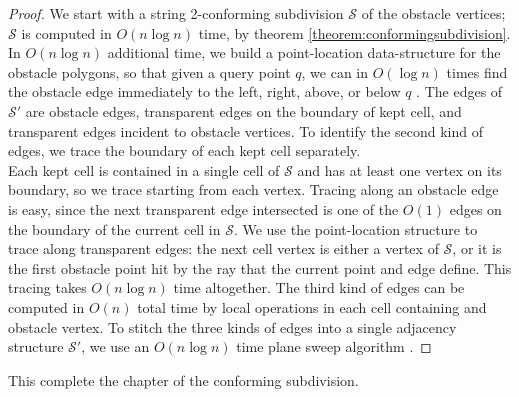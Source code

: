\begin{proof}
We start with a string 2-conforming subdivision $\mathcal{S}$ of the obstacle vertices; $\mathcal{S}$ is computed in $O(n\log n)$ time, by theorem \ref{theorem:conformingsubdivision}. In $O(n\log n)$ additional time, we build a point-location data-structure for the obstacle polygons, so that given a query point $q$, we can in $O(\log n)$ times find the obstacle edge immediately to the left, right, above, or below $q$ \cite{EdelsbrunnerGS86}\cite{Kirkpatrick83}. The edges of $\mathcal{S}'$ are obstacle edges, transparent edges on the boundary of kept cell, and transparent edges incident to obstacle vertices. To identify the second kind of edges, we trace the boundary of each kept cell separately. \\

Each kept cell is contained in a single cell of $\mathcal{S}$ and has at least one vertex on its boundary, so we trace starting from each vertex. Tracing along an obstacle edge is easy, since the next transparent edge intersected is one of the $O(1)$ edges on the boundary of the current cell in $\mathcal{S}$. We use the point-location structure to trace along transparent edges: the next cell vertex is either a vertex of $\mathcal{S}$, or it is the first obstacle point hit by the ray that the current point and edge define. This tracing takes $O(n\log n)$ time altogether. The third kind of edges can be computed in $O(n)$ total time by local operations in each cell containing and obstacle vertex. To stitch the three kinds of edges into a single adjacency structure $\mathcal{S}'$, we use an $O(n \log n)$ time plane sweep algorithm \cite{CompGeo}.
\end{proof}

This complete the chapter of the conforming subdivision.  



